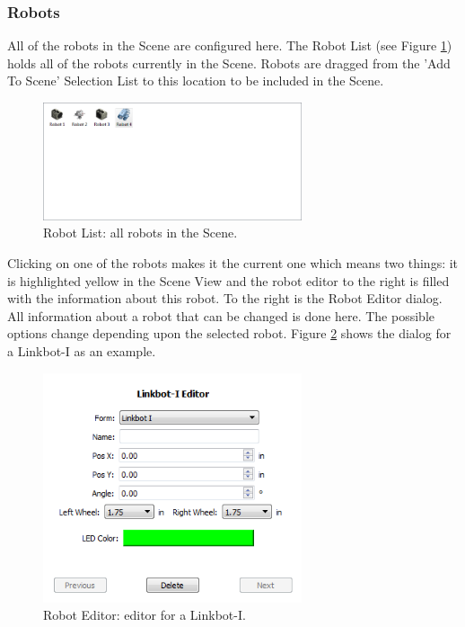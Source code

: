 \documentclass{article}
\begin{document}
\subsubsection{Robots}
All  of the robots in the Scene are configured here.  The Robot List
(see Figure \ref{fig:robot_list}) holds all of the robots currently in the
Scene.  Robots are dragged from the 'Add To Scene' Selection List to this
location to be included in the Scene.
\begin{figure}[H]
	\begin{center}
		\includegraphics[width=3in]{pictures/gui_robot_list}
	\end{center}
	\caption{Robot List: all robots in the Scene.}
	\label{fig:robot_list}
\end{figure}
Clicking on one of the robots makes it the current one which means two things:
it is highlighted yellow in the Scene View and the robot editor to the right is
filled with the information about this robot.  To the right is the Robot Editor
dialog.  All information about a robot that can be changed is done here.  The
possible options change depending upon the selected robot.  Figure
\ref{fig:editorI} shows the dialog for a Linkbot-I as an example.
\begin{figure}[H]
	\begin{center}
		\includegraphics[width=3in]{pictures/gui_editorI}
	\end{center}
	\caption{Robot Editor: editor for a Linkbot-I.}
	\label{fig:editorI}
\end{figure}
\end{document}
